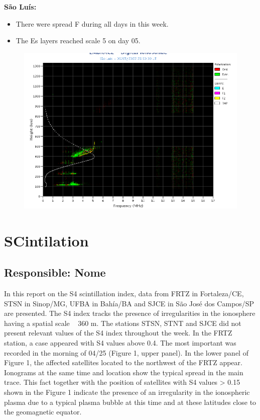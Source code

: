 \documentclass[a4paper, 10pt]{article}
\begin{document}
\textbf{São Luís: }

 \begin{itemize}
\item There were spread F during all days in this week.
\item The Es layers reached scale 5 on day 05. 
\end{itemize}
\begin{figure}[H]
    \centering
    \includegraphics[width=14cm]{./figures//SãoLuís.png}
\end{figure}

\section{SCintilation} 
 \subsection{Responsible: Nome} 
 
In this report on the S4 scintillation index, data from FRTZ in Fortaleza/CE, STSN 
in Sinop/MG, UFBA in Bahía/BA and SJCE in São José dos Campos/SP are 
presented. The S4 index tracks the presence of irregularities in the ionosphere 
having a spatial scale ~ 360 m. 
The stations STSN, STNT and SJCE did not present relevant values of the S4 
index throughout the week. In the FRTZ station, a case appeared with S4 values 
above 0.4. The most important was recorded in the morning of 04/25 (Figure 1, 
upper panel). In the lower panel of Figure 1, the affected satellites located to the 
northwest of the FRTZ appear. Ionograms at the same time and location show 
the typical spread in the main trace. This fact together with the position of 
satellites with S4 values > 0.15 shown in the Figure 1 indicate the presence of an 
irregularity in the ionospheric plasma due to a typical plasma bubble at this time 
and at these latitudes close to the geomagnetic equator. 
\end{document}
